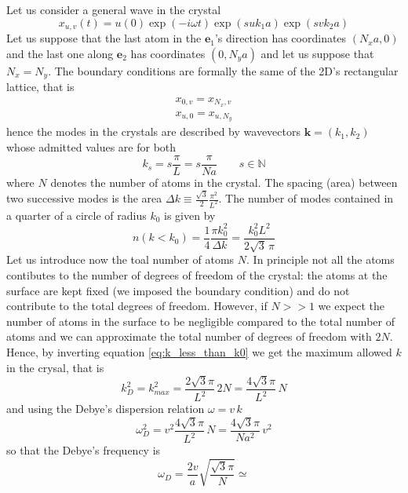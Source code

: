 \documentclass{article}
\newcommand{\ve}[1]{\mathbf{#1}}
\begin{document}
Let us consider a general wave in the crystal
\begin{equation*}
    x_{u,v}(t) = u(0)\exp(-i\omega t)\exp(suk_1a)\exp(svk_2a)
\end{equation*}
Let us suppose that the last atom in the $\ve e_1$'s direction has coordinates $(N_xa,0)$ and the last one along $\ve e_2$ has coordinates $(0, N_ya)$ and let us suppose that $N_x=N_y$.
The boundary conditions are formally the same of the 2D's rectangular lattice, that is 
\begin{gather*}
    x_{0,v} = x_{N_x,v} \\
    x_{u,0} = x_{u,N_y}
\end{gather*}
hence the modes in the crystals are described by wavevectors $\ve k = (k_1, k_2)$ whose admitted values are for both
$$k_{s} = s\frac{\pi}{L} = s\frac{\pi}{Na} \qquad s \in \mathbb{N}$$ 
where $N$ denotes the number of atoms in the crystal. The spacing (area) between two successive modes is the area
$\Delta k \equiv \frac{\sqrt{3}}{2} \frac{\pi^2}{L^2}$. The number of modes contained in a quarter of a circle of radius $k_0$ is given by 
\begin{equation}
    n(k < k_0) = \frac{1}{4} \frac{\pi k_0^2}{\Delta k} = \frac{k_0^2 L^2}{2\sqrt{3}\,\pi}
    \label{eq:k_less_than_k0}
\end{equation}
Let us introduce now the toal number of atoms $N$. In principle not all the atoms contibutes to the number of degrees of freedom of the crystal: the atoms at the surface
are kept fixed (we imposed the boundary condition) and do not contribute to the total degrees of freedom. However, if $N>>1$ we expect the number of atoms in the surface to be 
negligible compared to the total number of atoms and we can approximate the total number of degrees of freedom with $2N$.
Hence, by inverting equation \ref{eq:k_less_than_k0} we get the maximum allowed $k$ in the crysal, that is 
\begin{equation*}
    k_D^2 = k_{max}^2 = \frac{2 \sqrt{3} \pi}{L^2} \, 2N = \frac{4 \sqrt{3} \pi}{L^2} \, N
\end{equation*}
and using the Debye's dispersion relation $\omega = v \, k$
\begin{equation*}
    \omega_D^2 = v^2 \frac{4 \sqrt{3} \pi }{L^2} \, N = \frac{4 \sqrt{3} \pi }{N a^2} \, v^2 
\end{equation*}
so that the Debye's frequency is 
\begin{equation*}
    \omega_D = \frac{2v}{a} \sqrt{\frac{\sqrt{3} \pi }{N}} \simeq 
\end{equation*}
\end{document}
